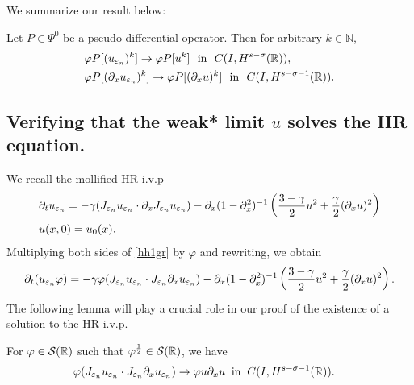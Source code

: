 We summarize our result below:
\begin{theorem}
\label{hhthm:crit1}
Let $P \in \Psi^0$ be a pseudo-differential operator. Then for
arbitrary $k \in \mathbb{N}$, 
\begin{equation}
\begin{split}
& \varphi P [(u_{\varepsilon_n})^k] \to \varphi P [u^k] \ \ \text{in}  \ \ C(I,
H^{s-\sigma }(\mathbb{R})),
\\
& 
\varphi P [(\partial_x u_{\varepsilon_n})^k] \to \varphi P [(\partial_x u)^k] \ \
\text{in}  \ \ C(I,
H^{s-\sigma -1}(\mathbb{R})).
\end{split}
\end{equation}
\end{theorem}
\subsection{Verifying that the weak* limit $u$ solves the HR equation.} 
We recall the mollified HR i.v.p
\begin{align}
& \partial_t u_{\varepsilon_n}  = -\gamma(J_{\varepsilon_n} u_{\varepsilon_n} \cdot \partial_x
J_{\varepsilon_n} u_{\varepsilon_n}) - \partial_x(1- \partial_x^2)^{-1} \left( \frac{3-\gamma}{2} u^2
+ \frac{\gamma}{2} (\partial_x u)^2 \right ) 
\label{hh1gr}
\\
& u(x,0) = u_0(x).
\label{hh2gr}
\end{align}
Multiplying both sides of \eqref{hh1gr} by $\varphi$ and rewriting,
we obtain
\begin{equation}
\label{hh3}
\begin{split}
\partial_t(u_{\varepsilon_n} \varphi) = -\gamma \varphi (J_{\varepsilon_n} u_{\varepsilon_n} \cdot
J_{\varepsilon_n} \partial_x u_{\varepsilon_n}) - \partial_x(1- \partial_x^2)^{-1} \left( \frac{3-\gamma}{2} u^2
+ \frac{\gamma}{2} (\partial_x u)^2 \right ).
\end{split}
\end{equation}
The following lemma will play a crucial role in our proof of the
existence of a solution to the HR i.v.p.
\begin{lemma}
\label{hhlem:cc}
For $\varphi \in \mathcal{S}(\mathbb{R})$ such that
$\varphi^\frac{1}{2} \in \mathcal{S}(\mathbb{R})$, we have
\begin{equation}
\begin{split}
\label{hhburgers_and_nonlocal_conv}
& \varphi (J_{\varepsilon_n} u_{\varepsilon_n} 
\cdot J_{\varepsilon_n}\partial_x u_{\varepsilon_n}) 
\to \varphi u \partial_x u \; \; 
\text{in} \; \;
C(I, H^{s-\sigma-1}(\mathbb{R})). 
\end{split}
\end{equation}
\end{lemma}
%

